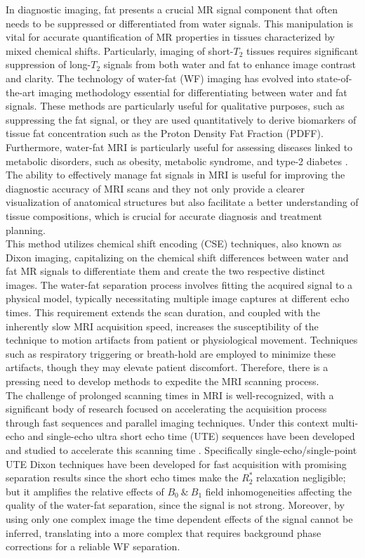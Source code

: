 In diagnostic imaging, fat presents a crucial MR signal component that often needs to be suppressed or differentiated from water signals. This manipulation is vital for accurate quantification of MR properties in tissues characterized by mixed chemical shifts. Particularly, imaging of short-\(T_2\) tissues requires significant suppression of long-\(T_2\) signals from both water and fat to enhance image contrast and clarity. The technology of water-fat (WF) imaging has evolved into state-of-the-art imaging methodology essential for differentiating between water and fat signals. These methods are particularly useful for qualitative purposes, such as suppressing the fat signal, or they are used quantitatively to derive biomarkers of tissue fat concentration such as the Proton Density Fat Fraction (PDFF). Furthermore, water-fat MRI is particularly useful for assessing diseases linked to metabolic disorders, such as obesity, metabolic syndrome, and type-2 diabetes \cite{water_fat_1, water_fat_2}. The ability to effectively manage fat signals in MRI is useful for improving the diagnostic accuracy of MRI scans and they not only provide a clearer visualization of anatomical structures but also facilitate a better understanding of tissue compositions, which is crucial for accurate diagnosis and treatment planning. \cite{chapter}\\

This method utilizes chemical shift encoding (CSE) techniques, also known as Dixon imaging, capitalizing on the chemical shift differences between water and fat MR signals to differentiate them and create the two respective distinct images. The water-fat separation process involves fitting the acquired signal to a physical model, typically necessitating multiple image captures at different echo times. This requirement extends the scan duration, and coupled with the inherently slow MRI acquisition speed, increases the susceptibility of the technique to motion artifacts from patient or physiological movement. Techniques such as respiratory triggering or breath-hold are employed to minimize these artifacts, though they may elevate patient discomfort. Therefore, there is a pressing need to develop methods to expedite the MRI scanning process.\\

The challenge of prolonged scanning times in MRI is well-recognized, with a significant body of research focused on accelerating the acquisition process through fast sequences and parallel imaging techniques. Under this context multi-echo and single-echo ultra short echo time (UTE) sequences have been developed and studied to accelerate this scanning time \cite{ute}. Specifically single-echo/single-point UTE Dixon techniques have been developed for fast acquisition with promising separation results since the short echo times make the \(R_2^*\) relaxation negligible; but it amplifies the relative effects of \(B_0 \: \& \: B_1\) field inhomogeneities affecting the quality of the water-fat separation, since the signal is not strong. Moreover, by using only one complex image the time dependent effects of the signal cannot be inferred, translating into a more complex that requires background phase corrections for a reliable WF separation.\\

